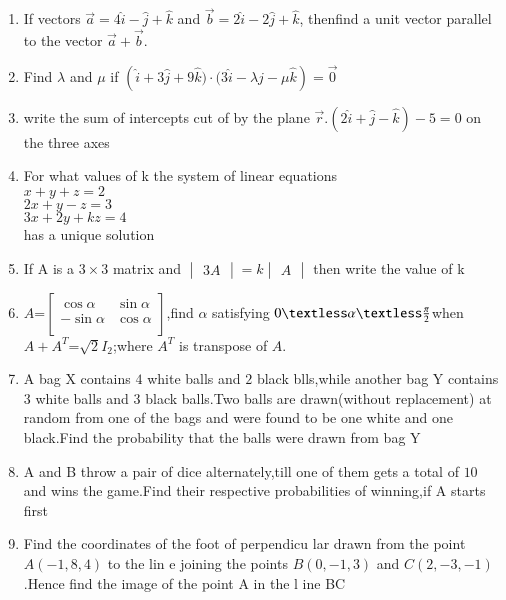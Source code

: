\documentclass[12pt,-letter paper]{article}
\providecommand{\mydet}[1]{\ensuremath{\begin{vmatrix}#1\end{vmatrix}}}
\providecommand{\myvec}[1]{\ensuremath{\begin{bmatrix}#1\end{bmatrix}}}
\providecommand{\brak}[1]{\ensuremath{\left(#1\right)}}
\begin{document}
\begin{enumerate}
	\item If vectors $\overset{\rightarrow}{a} = 4\hat{i} - \hat{j} + \hat{k}$ and $\overset{\rightarrow}{b} = 2\hat{i} - 2\hat{j} + \hat{k}$, thenfind a unit vector parallel to the vector $\overset{\rightarrow}{a} + \overset{\rightarrow}{b}$.

 \item Find $\lambda$ and $\mu$ if 
	 $\brak{\hat{i} +3\hat{j} + 9\hat{k}) \cdot (3\hat{i} - \lambda \hat{j} - \mu \hat{k}} =\overset\rightarrow 0$
  

 \item  write the sum of intercepts cut of by the plane $    \overset{\rightarrow}{r}.\brak{2\hat{i}+\hat{j}-\hat{k}}-5=0$     on the three axes



\item For what values of k the system of linear equations\\
$x+y+z=2$\\
$2x+y-z=3$\\
$3x+2y+kz=4$\\
has a unique solution

\item If A is a $3\times3$ matrix and $\mydet{3A}=k\mydet{A}$ then     write the value of k


 \item $A$=$\myvec{\cos\alpha&\sin\alpha\\                           -\sin\alpha&\cos\alpha\\}$,find $\alpha$ satisfying $0\textless\alpha\textless\frac{\pi}{2}$when $A+A^T$=$\sqrt{2}$$I_{2}$;where $A^T$ is     transpose of $A$.

	\item A bag X contains $4$ white balls and $2$ black blls,while another bag Y contains $3$ white balls and $3$ black balls.Two balls are drawn(without replacement) at random from one of the bags and were found to be one white and one black.Find the probability that the balls were drawn from bag Y
	
	\item A and B throw a pair of dice alternately,till one of them gets a total of $10$ and wins the game.Find their respective probabilities of winning,if A starts first		


	\item Find the coordinates of the foot of perpendicu    lar drawn from the point $A\brak{-1,8,4}$ to the lin    e joining the points $B\brak{0,-1,3}$ and $C\brak{2,    -3,-1}$.Hence find the image of the point A in the l    ine BC




\end{enumerate}
\end{document}
